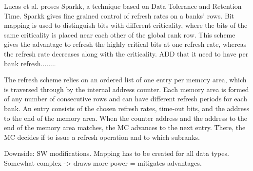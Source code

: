 Lucas et al. \cite{sparkk} proses Sparkk, a technique based on Data Tolerance and Retention Time. Sparkk gives fine grained control of refresh rates on a banks' rows. Bit mapping is used to distinguish bits with different criticality, where the bits of the same criticality is placed near each other of the global rank row. This scheme gives the advantage to refresh the highly critical bits at one refresh rate, whereas the refresh rate decreases along with the criticality. ADD that it need to have per bank refresh........

The refresh scheme relies on an ordered list of one entry per memory area, which is traversed through by the internal address counter. Each memory area is formed of any number of consecutive rows and can have different refresh periods for each bank. An entry consists of the chosen refresh rates, time-out bits, and the address to the end of the memory area. When the counter address and the address to the end of the memory area matches, the MC advances to the next entry. There, the MC decides if to issue a refresh operation and to which subranks.

Downside: SW modifications. Mapping has to be created for all data types. Somewhat complex -> draws more power = mitigates advantages.
